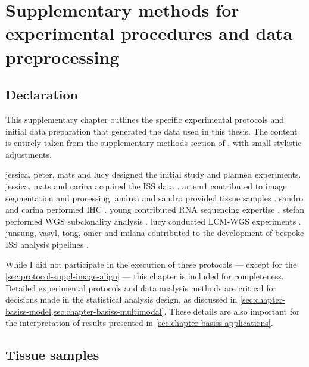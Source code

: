 \chapter{Supplementary methods for experimental procedures and data preprocessing}
\label{sec:supplement-chapter-method}
\section*{Declaration}

This supplementary chapter outlines the specific experimental protocols and initial data preparation that generated the data used in this thesis. The content is entirely taken from the supplementary methods section of \textcite{Lomakin2022-ks}, with small stylistic adjustments.

\ac{jessica}, \ac{peter}, \ac{mats} and \ac{lucy} designed the initial study and planned experiments. \ac{jessica}, \ac{mats} and \ac{carina} acquired the \ac{ISS} data . \ac{artem1} contributed to image segmentation and processing. \ac{andrea} and \ac{sandro} provided tissue samples . \ac{sandro} and \ac{carina} performed \ac{IHC} . \ac{young} contributed RNA sequencing expertise . \ac{stefan} performed \ac{WGS} subclonality analysis . \ac{lucy} conducted \ac{LCM}-\ac{WGS} experiments . \ac{junsung}, \ac{vasyl}, \ac{tong}, \ac{omer} and \ac{milana} contributed to the development of bespoke \ac{ISS} analysis pipelines .

While I did not participate in the execution of these protocols — except for the \cref{sec:protocol-suppl-image-align} — this chapter is included for completeness. Detailed experimental protocols and data analysis methods are critical for decisions made in the statistical analysis design, as discussed in \cref{sec:chapter-basiss-model,sec:chapter-basiss-multimodal}. These details are also important for the interpretation of results presented in \cref{sec:chapter-basiss-applications}.

\section{Tissue samples}
\label{sec:protocol-suppl-tissues}

